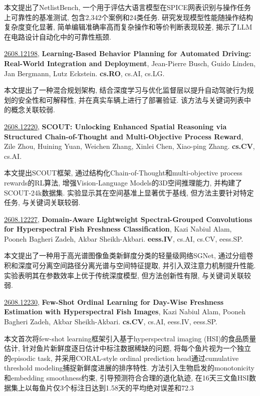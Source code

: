 \documentclass[9pt, a4paper]{article}
\theoremstyle{plain}
\theoremstyle{definition}
\theoremstyle{remark}
\newcommand{\arxivwithtarget}[3]{\hypertarget{#1}{}\href{https://arxiv.org/abs/#1}{#1}, \textbf{\textcolor{arxivblue}{#2}}, #3. }
\begin{document}
本文提出了NetlistBench, 一个用于评估大语言模型在SPICE网表识别与操作任务上可靠性的基准测试, 包含2,342个案例和24类任务. 研究发现模型性能随操作结构复杂度变化显著, 简单编辑准确率高而复杂操作和等价判断表现较差, 揭示了LLM在电路设计自动化中的可靠性瓶颈.


\arxivwithtarget{2608.12198}{Learning-Based Behavior Planning for Automated Driving: Real-World Integration and Deployment}{Jean-Pierre Busch, Guido Linden, Jan Bergmann, Lutz Eckstein}\textbf{cs.RO}, cs.AI, cs.LG.

本文提出了一种混合规划架构, 结合深度学习与优化监督层以提升自动驾驶行为规划的安全性和可解释性, 并在真实车辆上进行了部署验证. 该方法与关键词列表中的概念关联较弱.


\arxivwithtarget{2608.12220}{SCOUT: Unlocking Enhanced Spatial Reasoning via Structured Chain-of-Thought and Multi-Objective Process Reward}{Zile Zhou, Huining Yuan, Weichen Zhang, Xinlei Chen, Xiao-ping Zhang}\textbf{cs.CV}, cs.AI.

本文提出SCOUT框架, 通过结构化Chain-of-Thought和multi-objective process rewards的RL算法, 增强Vision-Language Models的3D空间推理能力, 并构建了SCOUT-24k数据集. 实验显示其在空间基准上显著优于基线, 但方法主要针对特定任务, 与关键词关联较弱.


\arxivwithtarget{2608.12227}{Domain-Aware Lightweight Spectral-Grouped Convolutions for Hyperspectral Fish Freshness Classification}{Kazi Nabiul Alam, Pooneh Bagheri Zadeh, Akbar Sheikh-Akbari}\textbf{eess.IV}, cs.AI, cs.CV, eess.SP.

本文提出了一种用于高光谱图像鱼类新鲜度分类的轻量级网络SGNet, 通过分组卷积和深度可分离空间路径分离光谱与空间特征提取, 并引入双注意力机制提升性能. 实验表明其在参数效率上优于传统深度模型, 但方法创新性有限, 与关键词关联较弱.


\arxivwithtarget{2608.12230}{Few-Shot Ordinal Learning for Day-Wise Freshness Estimation with Hyperspectral Fish Images}{Kazi Nabiul Alam, Pooneh Bagheri Zadeh, Akbar Sheikh-Akbari}\textbf{cs.CV}, cs.AI, eess.IV, eess.SP.

本文首次将few-shot learning框架引入基于hyperspectral imaging (HSI)的食品质量估计, 针对鱼片新鲜度逐日估计中标注数据稀缺的问题, 将每个鱼片视为一个独立的episodic task, 并采用CORAL-style ordinal prediction head通过cumulative threshold modeling捕捉新鲜度进展的排序特性. 方法引入生物启发的monotonicity和embedding smoothness约束, 引导预测符合合理的退化轨迹, 在16天三文鱼HSI数据集上以每鱼片仅3个标注日达到1.58天的平均绝对误差和72.3%
\end{document}
